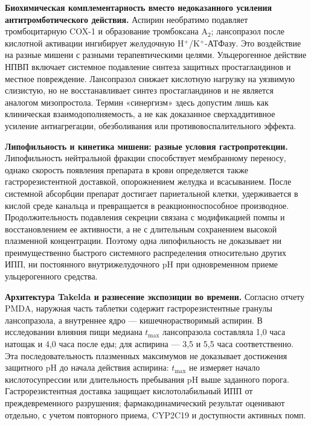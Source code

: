 \documentclass[11pt,a4paper,notitlepage]{report}
\newcommand{\src}[1]{\unskip\space\cite{#1}}
\begin{document}
\textbf{Биохимическая комплементарность вместо недоказанного усиления антитромботического действия.} Аспирин необратимо подавляет тромбоцитарную COX-1 и образование тромбоксана A$_2$; лансопразол после кислотной активации ингибирует желудочную H$^+$/K$^+$-АТФазу. Это воздействие на разные мишени с разными терапевтическими целями.\src{fdctakeldalabel} Ульцерогенное действие НПВП включает системное подавление синтеза защитных простагландинов и местное повреждение. Лансопразол снижает кислотную нагрузку на уязвимую слизистую, но не восстанавливает синтез простагландинов и не является аналогом мизопростола. Термин «синергизм» здесь допустим лишь как клиническая взаимодополняемость, а не как доказанное сверхаддитивное усиление антиагрегации, обезболивания или противовоспалительного эффекта.\src{fdcnaprapac,misotrial}

\textbf{Липофильность и кинетика мишени: разные условия гастропротекции.} Липофильность нейтральной фракции способствует мембранному переносу, однако скорость появления препарата в крови определяется также гастрорезистентной доставкой, опорожнением желудка и всасыванием. После системной абсорбции препарат достигает париетальной клетки, удерживается в кислой среде канальца и превращается в реакционноспособное производное. Продолжительность подавления секреции связана с модификацией помпы и восстановлением ее активности, а не с длительным сохранением высокой плазменной концентрации. Поэтому одна липофильность не доказывает ни преимущественно быстрого системного распределения относительно других ИПП, ни постоянного внутрижелудочного pH при одновременном приеме ульцерогенного средства.\src{molchem,molcys,molrestore,uslabel}

\textbf{Архитектура Takelda и разнесение экспозиции во времени.} Согласно отчету PMDA, наружная часть таблетки содержит гастрорезистентные гранулы лансопразола, а внутреннее ядро --- кишечнорастворимый аспирин. В исследовании влияния пищи медиана $t_{\max}$ лансопразола составляла 1,0 часа натощак и 4,0 часа после еды; для аспирина --- 3,5 и 5,5 часа соответственно. Эта последовательность плазменных максимумов не доказывает достижения защитного pH до начала действия аспирина: $t_{\max}$ не измеряет начало кислотосупрессии или длительность пребывания pH выше заданного порога.\src{fdctakeldareview} Гастрорезистентная доставка защищает кислотолабильный ИПП от преждевременного разрушения; фармакодинамический результат оценивают отдельно, с учетом повторного приема, CYP2C19 и доступности активных помп.\src{uslabel,cpic,molrestore}
\end{document}

